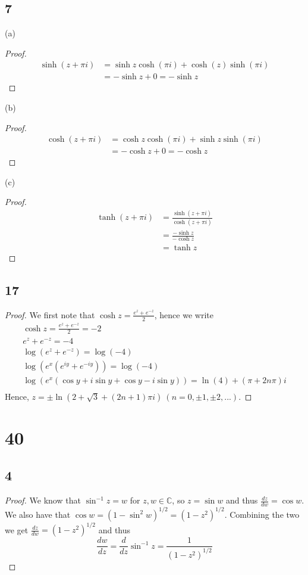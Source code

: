 \documentclass{article}
\newcommand{\C}{\mathbb{C}}
\begin{document}
\subsection*{7} %
(a)
\begin{proof}
    \begin{align*}
        \sinh (z + \pi i) & = \sinh z \cosh(\pi i) + \cosh(z) \sinh (\pi i) \\
                          & = -\sinh z + 0 = -\sinh z
    \end{align*}
\end{proof}
(b) \begin{proof}
    \begin{align*}
        \cosh(z + \pi i) & = \cosh z \cosh(\pi i) + \sinh z \sinh (\pi i) \\
                         & = -\cosh z + 0 = -\cosh z
    \end{align*}
\end{proof}
(c)
\begin{proof}
    \begin{align*}
        \tanh(z + \pi i) & = \frac{\sinh(z + \pi i)}{\cosh(z + \pi i)} \\
                         & = \frac{-\sinh z}{-\cosh z}                 \\
                         & = \tanh z
    \end{align*}
\end{proof}
\subsection*{17} %
\begin{proof}
    We first note that $\cosh z = \frac{e^z + e^{-z}}{2}$, hence we write
    \begin{gather*}
        \cosh z = \frac{e^z + e^{-z}}{2} = -2 \\
        e^z + e^{-z} = -4 \\
        \log(e^z + e^{-z}) = \log(-4) \\
        \log(e^x(e^{iy} + e^{-iy})) = \log(-4) \\
        \log(e^x(\cos y + i\sin y + \cos y - i\sin y)) = \ln(4) + (\pi + 2n\pi)i \\
    \end{gather*}
    Hence, $z = \pm \ln(2 + \sqrt{3} + (2n + 1)\pi i) \ (n = 0, \pm 1, \pm 2,...).$
\end{proof}
\section*{40}
\subsection*{4}%
\begin{proof}
    We know that $\sin^{-1}z = w$ for $z,w \in \C$, so $z = \sin w$ and thus
    $\frac{dz}{dw} = \cos w$. We also have that
    $\cos w = (1-\sin^2 w)^{1/2} = (1-z^2)^{1/2}$. Combining the two
    we get $\frac{dz}{dw} = (1-z^2)^{1/2}$ and thus
    $$\frac{dw}{dz} = \frac{d}{dz}\sin^{-1} z = \frac{1}{(1-z^2)^{1/2}}$$
\end{proof}
\end{document}
